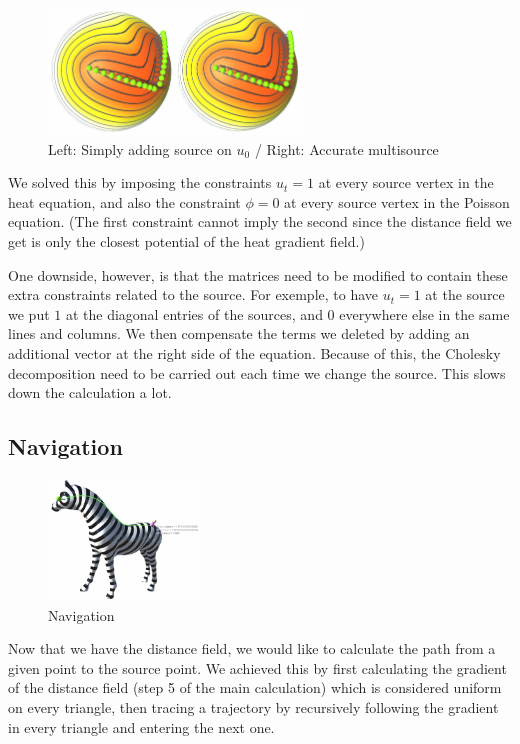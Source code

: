 \documentclass[a4paper,12pt,twoside]{article}
\begin{document}
\begin{figure}[htb]
	\centering
	\includegraphics[width=0.6\textwidth]{P6.png}
	\caption{Left: Simply adding source on $u_0$ / Right: Accurate multisource}
\end{figure}

We solved this by imposing the constraints $u_t = 1$ at every source vertex in the heat equation, and also the constraint $\phi = 0$ at every source vertex in the Poisson equation. (The first constraint cannot imply the second since the distance field we get is only the closest potential of the heat gradient field.)

One downside, however, is that the matrices need to be modified to contain these extra constraints related to the source. For exemple, to have $u_t = 1$ at the source we put $1$ at the diagonal entries of the sources, and $0$ everywhere else in the same lines and columns. We then compensate the terms we deleted by adding an additional vector at the right side of the equation. Because of this, the Cholesky decomposition need to be carried out each time we change the source. This slows down the calculation a lot.

\subsection{Navigation}

\begin{figure}
	\centering
	\includegraphics[width=0.36\textwidth]{P7.png}
	\caption{Navigation}
\end{figure}

Now that we have the distance field, we would like to calculate the path from a given point to the source point. We achieved this by first calculating the gradient of the distance field (step 5 of the main calculation) which is considered uniform on every triangle, then tracing a trajectory by recursively following the gradient in every triangle and entering the next one.
\end{document}
